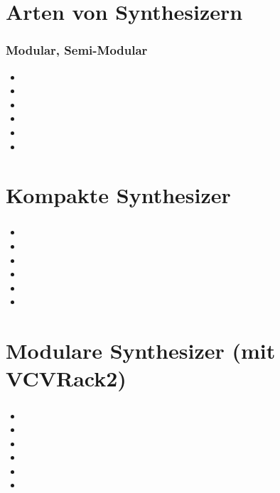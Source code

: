 \documentclass[12pt,ngerman]{beamer}
\begin{document}
\section{Arten von Synthesizern}
 
\begin{frame}
\frametitle{Modular, Semi-Modular}

\begin{itemize}
\item 
\item 
\item 
\item 
\item 
\item 
\end{itemize}
\end{frame}

\section{Kompakte Synthesizer}
 
\begin{frame}
\frametitle{}


\begin{itemize}
\item 
\item 
\item 
\item 
\item 
\item 
\end{itemize}
\end{frame}
 
\section{Modulare Synthesizer (mit VCVRack2)} 
 
\begin{frame}
\frametitle{}


\begin{itemize}
\item 
\item 
\item 
\item 
\item 
\item 
\end{itemize}
\end{frame} 
 
 
\end{document}

